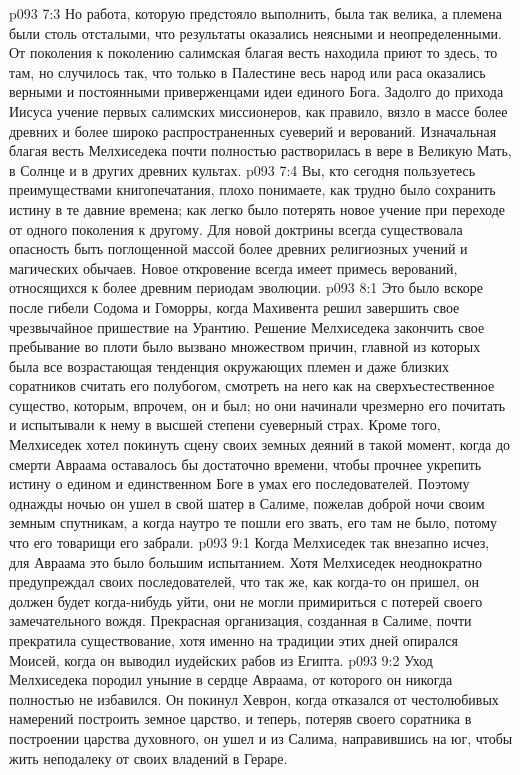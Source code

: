 \vs p093 7:3 Но работа, которую предстояло выполнить, была так велика, а племена были столь отсталыми, что результаты оказались неясными и неопределенными. От поколения к поколению салимская благая весть находила приют то здесь, то там, но случилось так, что только в Палестине весь народ или раса оказались верными и постоянными приверженцами идеи единого Бога. Задолго до прихода Иисуса учение первых салимских миссионеров, как правило, вязло в массе более древних и более широко распространенных суеверий и верований. Изначальная благая весть Мелхиседека почти полностью растворилась в вере в Великую Мать, в Солнце и в других древних культах.
\vs p093 7:4 \pc Вы, кто сегодня пользуетесь преимуществами книгопечатания, плохо понимаете, как трудно было сохранить истину в те давние времена; как легко было потерять новое учение при переходе от одного поколения к другому. Для новой доктрины всегда существовала опасность быть поглощенной массой более древних религиозных учений и магических обычаев. Новое откровение всегда имеет примесь верований, относящихся к более древним периодам эволюции.
\vs p093 8:1 Это было вскоре после гибели Содома и Гоморры, когда Махивента решил завершить свое чрезвычайное пришествие на Урантию. Решение Мелхиседека закончить свое пребывание во плоти было вызвано множеством причин, главной из которых была все возрастающая тенденция окружающих племен и даже близких соратников считать его полубогом, смотреть на него как на сверхъестественное существо, которым, впрочем, он и был; но они начинали чрезмерно его почитать и испытывали к нему в высшей степени суеверный страх. Кроме того, Мелхиседек хотел покинуть сцену своих земных деяний в такой момент, когда до смерти Авраама оставалось бы достаточно времени, чтобы прочнее укрепить истину о едином и единственном Боге в умах его последователей. Поэтому однажды ночью он ушел в свой шатер в Салиме, пожелав доброй ночи своим земным спутникам, а когда наутро те пошли его звать, его там не было, потому что его товарищи его забрали.
\vs p093 9:1 Когда Мелхиседек так внезапно исчез, для Авраама это было большим испытанием. Хотя Мелхиседек неоднократно предупреждал своих последователей, что так же, как когда\hyp{}то он пришел, он должен будет когда\hyp{}нибудь уйти, они не могли примириться с потерей своего замечательного вождя. Прекрасная организация, созданная в Салиме, почти прекратила существование, хотя именно на традиции этих дней опирался Моисей, когда он выводил иудейских рабов из Египта.
\vs p093 9:2 \pc Уход Мелхиседека породил уныние в сердце Авраама, от которого он никогда полностью не избавился. Он покинул Хеврон, когда отказался от честолюбивых намерений построить земное царство, и теперь, потеряв своего соратника в построении царства духовного, он ушел и из Салима, направившись на юг, чтобы жить неподалеку от своих владений в Гераре.
